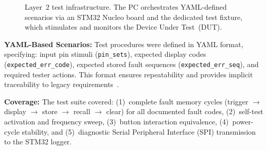 \documentclass[journal, a4paper]{IEEEtran}
\newif\iffirstSPI   \firstSPItrue
\newcommand{\SPI}{\iffirstSPI Serial Peripheral Interface (SPI)\global\firstSPIfalse\else SPI\fi}
\begin{document}
\begin{figure}[!t]
  \centering
  \caption{Layer~2 test infrastructure. The PC orchestrates YAML-defined scenarios via an STM32 Nucleo board and the dedicated test fixture, which stimulates and monitors the Device Under Test~(DUT).}
  \label{fig:fixture}
\end{figure}

\textbf{YAML-Based Scenarios:} Test procedures were defined in YAML format, specifying: input pin stimuli (\texttt{pin\_sets}), expected display codes (\texttt{expected\_err\_code}), expected stored fault sequences (\texttt{expected\_err\_seq}), and required tester actions. This format ensures repeatability and provides implicit traceability to legacy requirements~\cite{rexroth1992wsp}.

\textbf{Coverage:} The test suite covered: (1)~complete fault memory cycles (trigger $\rightarrow$ display $\rightarrow$ store $\rightarrow$ recall $\rightarrow$ clear) for all documented fault codes, (2)~self-test activation and frequency sweep, (3)~button interaction equivalence, (4)~power-cycle stability, and (5)~diagnostic \SPI{} transmission to the STM32 logger.
\end{document}
